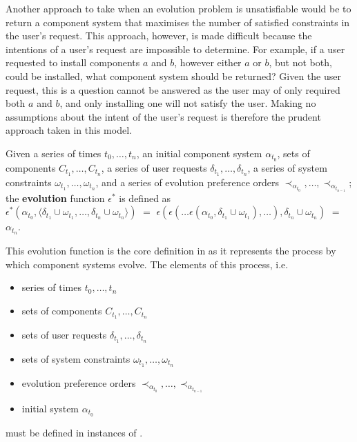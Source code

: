 Another approach to take when an evolution problem is unsatisfiable would be to return a component system that maximises the number of satisfied constraints in the user's request.
This approach, however, is made difficult because the intentions of a user's request are impossible to determine.
For example, if a user requested to install components $a$ and $b$, however either $a$ or $b$, but not both, could be installed, what component system should be returned?
Given the user request, this is a question cannot be answered as the user may of only required both $a$ and $b$, and only installing one will not satisfy the user.
Making no assumptions about the intent of the user's request is therefore the prudent approach taken in this model.

\begin{defs}
Given a series of times $t_0,\ldots,t_n$, an initial component system $\alpha_{t_0}$, 
sets of components $C_{t_1},\ldots,C_{t_n}$, a series of user requests $\delta_{t_1},\ldots,\delta_{t_n}$, a series of system constraints $\omega_{t_1},\ldots,\omega_{t_n}$,
and a series of evolution preference orders $\prec_{\alpha_{t_0}},\ldots, \prec_{\alpha_{t_{n-1}}}$;
the \textbf{evolution} function $\epsilon^*$ is defined as\\
$\epsilon^*(\alpha_{t_0},\langle \delta_{t_1} \cup \omega_{t_1},\ldots,\delta_{t_n} \cup \omega_{t_n} \rangle)$ $=$ $\epsilon(\epsilon(\ldots \epsilon(\alpha_{t_0},\delta_{t_1} \cup \omega_{t_1}),\ldots),\delta_{t_n} \cup \omega_{t_n})$
$=$ $\alpha_{t_n}$.
\end{defs}

This evolution function is the core definition in \modelname as it represents the process by which component systems evolve.
The elements of this process, i.e. 
\begin{itemize}
  \item series of times $t_0,\ldots,t_n$
  \item sets of components $C_{t_1},\ldots,C_{t_n}$
  \item sets of user requests $\delta_{t_1},\ldots,\delta_{t_n}$
  \item sets of system constraints $\omega_{t_1},\ldots,\omega_{t_n}$
  \item evolution preference orders $\prec_{\alpha_{t_0}},\ldots, \prec_{\alpha_{t_{n-1}}}$
  \item initial system $\alpha_{t_0}$
\end{itemize}
must be defined in instances of \modelname.

